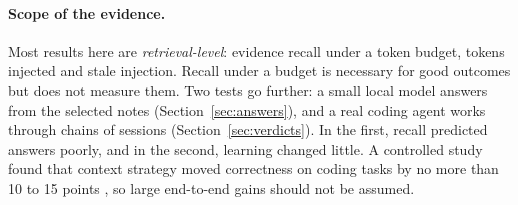 \paragraph{Scope of the evidence.} Most results here are \emph{retrieval-level}: evidence recall under a token budget, tokens injected and stale injection. Recall under a budget is necessary for good outcomes but does not measure them. Two tests go further: a small local model answers from the selected notes (Section~\ref{sec:answers}), and a real coding agent works through chains of sessions (Section~\ref{sec:verdicts}). In the first, recall predicted answers poorly, and in the second, learning changed little. A controlled study found that context strategy moved correctness on coding tasks by no more than 10 to 15 points \cite{khatri2026contextfiles}, so large end-to-end gains should not be assumed.
